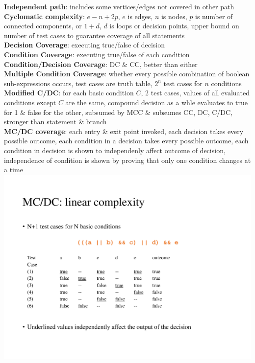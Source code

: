 \documentclass[a4paper]{article}
\begin{document}
\begin{multicols}{3}
        \textbf{Independent path}: includes some vertices/edges not covered in other path\\
        \textbf{Cyclomatic complexity}: $e-n+2p$, $e$ is edges, $n$ is nodes, $p$ is number of connected components, or $1+d$, $d$ is loops or decision points, upper bound on number of test cases to guarantee coverage of all statements\\
        \textbf{Decision Coverage}: executing true/false of decision\\
        \textbf{Condition Coverage}: executing true/false of each condition\\
        \textbf{Condition/Decision Coverage}: DC \& CC, better than either\\
        \textbf{Multiple Condition Coverage}: whether every possible combination of boolean sub-expressions occurs, test cases are truth table, $2^n$ test cases for $n$ conditions\\
        \textbf{Modified C/DC}: for each basic condition $C$, 2 test cases, values of all evaluated conditions except $C$ are the same, compound decision as a whle evaluates to true for 1 \& false for the other, subsumed by MCC \& subsumes CC, DC, C/DC, stronger than statement \& branch\\
        \textbf{MC/DC coverage}: each entry \& exit point invoked, each decision takes every possible outcome, each condition in a decision takes every possible outcome, each condition in decision is shown to independenly affect outcome of decision, independence of condition is shown by proving that only one condition changes at a time\\
        \includegraphics[width=\linewidth]{148.pdf}\\

\end{multicols}
\end{document}
